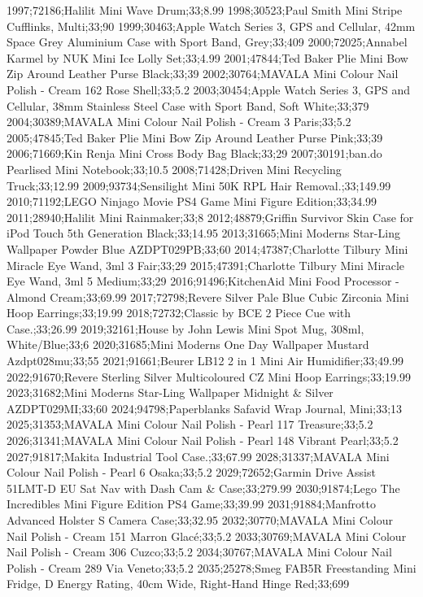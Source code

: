 1997;72186;Halilit Mini Wave Drum;33;8.99
1998;30523;Paul Smith Mini Stripe Cufflinks, Multi;33;90
1999;30463;Apple Watch Series 3, GPS and Cellular, 42mm Space Grey Aluminium Case with Sport Band, Grey;33;409
2000;72025;Annabel Karmel by NUK Mini Ice Lolly Set;33;4.99
2001;47844;Ted Baker Plie Mini Bow Zip Around Leather Purse Black;33;39
2002;30764;MAVALA Mini Colour Nail Polish - Cream 162 Rose Shell;33;5.2
2003;30454;Apple Watch Series 3, GPS and Cellular, 38mm Stainless Steel Case with Sport Band, Soft White;33;379
2004;30389;MAVALA Mini Colour Nail Polish - Cream 3 Paris;33;5.2
2005;47845;Ted Baker Plie Mini Bow Zip Around Leather Purse Pink;33;39
2006;71669;Kin Renja Mini Cross Body Bag Black;33;29
2007;30191;ban.do Pearlised Mini Notebook;33;10.5
2008;71428;Driven Mini Recycling Truck;33;12.99
2009;93734;Sensilight Mini 50K RPL Hair Removal.;33;149.99
2010;71192;LEGO Ninjago Movie PS4 Game Mini Figure Edition;33;34.99
2011;28940;Halilit Mini Rainmaker;33;8
2012;48879;Griffin Survivor Skin Case for iPod Touch 5th Generation Black;33;14.95
2013;31665;Mini Moderns Star-Ling Wallpaper Powder Blue AZDPT029PB;33;60
2014;47387;Charlotte Tilbury Mini Miracle Eye Wand, 3ml 3 Fair;33;29
2015;47391;Charlotte Tilbury Mini Miracle Eye Wand, 3ml 5 Medium;33;29
2016;91496;KitchenAid Mini Food Processor - Almond Cream;33;69.99
2017;72798;Revere Silver Pale Blue Cubic Zirconia Mini Hoop Earrings;33;19.99
2018;72732;Classic by BCE 2 Piece Cue with Case.;33;26.99
2019;32161;House by John Lewis Mini Spot Mug, 308ml, White/Blue;33;6
2020;31685;Mini Moderns One Day Wallpaper Mustard Azdpt028mu;33;55
2021;91661;Beurer LB12 2 in 1 Mini Air Humidifier;33;49.99
2022;91670;Revere Sterling Silver Multicoloured CZ Mini Hoop Earrings;33;19.99
2023;31682;Mini Moderns Star-Ling Wallpaper Midnight & Silver AZDPT029MI;33;60
2024;94798;Paperblanks Safavid Wrap Journal, Mini;33;13
2025;31353;MAVALA Mini Colour Nail Polish - Pearl 117 Treasure;33;5.2
2026;31341;MAVALA Mini Colour Nail Polish - Pearl 148 Vibrant Pearl;33;5.2
2027;91817;Makita Industrial Tool Case.;33;67.99
2028;31337;MAVALA Mini Colour Nail Polish - Pearl 6 Osaka;33;5.2
2029;72652;Garmin Drive Assist 51LMT-D EU Sat Nav with Dash Cam & Case;33;279.99
2030;91874;Lego The Incredibles Mini Figure Edition PS4 Game;33;39.99
2031;91884;Manfrotto Advanced Holster S Camera Case;33;32.95
2032;30770;MAVALA Mini Colour Nail Polish - Cream 151 Marron Glacé;33;5.2
2033;30769;MAVALA Mini Colour Nail Polish - Cream 306 Cuzco;33;5.2
2034;30767;MAVALA Mini Colour Nail Polish - Cream 289 Via Veneto;33;5.2
2035;25278;Smeg FAB5R Freestanding Mini Fridge, D Energy Rating, 40cm Wide, Right-Hand Hinge Red;33;699

